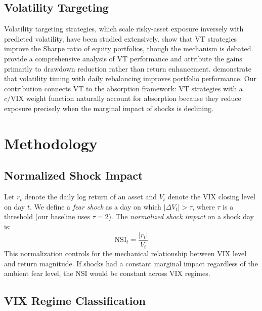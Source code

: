 \documentclass[12pt,a4paper]{article}
\begin{document}
\subsection{Volatility Targeting}

Volatility targeting strategies, which scale risky-asset exposure inversely with predicted volatility, have been studied extensively. \citet{moreira2017} show that VT strategies improve the Sharpe ratio of equity portfolios, though the mechanism is debated. \citet{harvey2018} provide a comprehensive analysis of VT performance and attribute the gains primarily to drawdown reduction rather than return enhancement. \citet{fleming2001} demonstrate that volatility timing with daily rebalancing improves portfolio performance. Our contribution connects VT to the absorption framework: VT strategies with a $c/\text{VIX}$ weight function naturally account for absorption because they reduce exposure precisely when the marginal impact of shocks is declining.


\section{Methodology}
\label{sec:method}

\subsection{Normalized Shock Impact}

Let $r_t$ denote the daily log return of an asset and $V_t$ denote the VIX closing level on day $t$. We define a \textit{fear shock} as a day on which $|\Delta V_t| > \tau$, where $\tau$ is a threshold (our baseline uses $\tau = 2$). The \textit{normalized shock impact} on a shock day is:
\begin{equation}
\text{NSI}_t = \frac{|r_t|}{V_t}
\label{eq:nsi}
\end{equation}
This normalization controls for the mechanical relationship between VIX level and return magnitude. If shocks had a constant marginal impact regardless of the ambient fear level, the NSI would be constant across VIX regimes.

\subsection{VIX Regime Classification}
\end{document}

